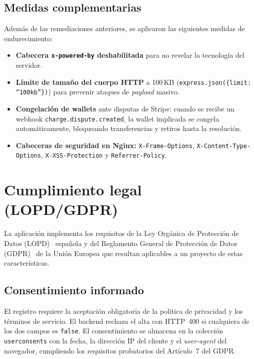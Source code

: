 \section{Medidas complementarias}

Además de las remediaciones anteriores, se aplicaron las siguientes medidas de endurecimiento:

\begin{itemize}
  \item \textbf{Cabecera \texttt{x-powered-by} deshabilitada} para no revelar la tecnología del servidor.
  \item \textbf{Límite de tamaño del cuerpo HTTP} a 100\,KB (\texttt{express.json(\{limit: ``100kb''\})}) para prevenir ataques de \emph{payload} masivo.
  \item \textbf{Congelación de wallets} ante disputas de Stripe: cuando se recibe un webhook \texttt{charge.dispute.created}, la wallet implicada se congela automáticamente, bloqueando transferencias y retiros hasta la resolución.
  \item \textbf{Cabeceras de seguridad en Nginx:} \texttt{X-Frame-Options}, \texttt{X-Content-Type-Options}, \texttt{X-XSS-Protection} y \texttt{Referrer-Policy}.
\end{itemize}

\chapter{Cumplimiento legal (LOPD/GDPR)}\label{ch:lopd}

La aplicación implementa los requisitos de la Ley Orgánica de Protección de Datos (LOPD)~\cite{lopd} española y del Reglamento General de Protección de Datos (GDPR)~\cite{gdpr} de la Unión Europea que resultan aplicables a un proyecto de estas características.

\section{Consentimiento informado}

El registro requiere la aceptación obligatoria de la política de privacidad y los términos de servicio. El backend rechaza el alta con HTTP~400 si cualquiera de los dos campos es \texttt{false}. El consentimiento se almacena en la colección \texttt{userconsents} con la fecha, la dirección IP del cliente y el \emph{user-agent} del navegador, cumpliendo los requisitos probatorios del Artículo~7 del GDPR.

